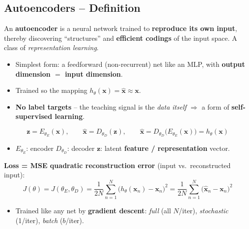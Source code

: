 \documentclass[10pt,a4paper]{article}
\begin{document}
	\subsection{Autoencoders -- Definition}

	\begin{definitionbox}
		An \textbf{autoencoder} is a neural network trained to \textbf{reproduce its own input}, thereby discovering ``structures'' and \textbf{efficient codings} of the input space. A class of \emph{representation learning}.
	\end{definitionbox}

	\begin{itemize}[leftmargin=*]
		\item Simplest form: a feedforward (non-recurrent) net like an MLP, with \textbf{output dimension $=$ input dimension}.
		\item Trained so the mapping $h_\theta(\mathbf{x}) = \hat{\mathbf{x}} \approx \mathbf{x}$.
		\item \textbf{No label targets} -- the teaching signal is the \emph{data itself} $\Rightarrow$ a form of \textbf{self-supervised learning}.
	\end{itemize}

	\begin{formulabox}
		\[
		\mathbf{z} = E_{\theta_E}(\mathbf{x}), \qquad
		\hat{\mathbf{x}} = D_{\theta_D}(\mathbf{z}), \qquad
		\hat{\mathbf{x}} = D_{\theta_D}\!\big(E_{\theta_E}(\mathbf{x})\big) = h_\theta(\mathbf{x})
		\]
	\end{formulabox}
	\begin{itemize}[leftmargin=*]
		\item $E_{\theta_E}$: encoder \quad $D_{\theta_D}$: decoder \quad $\mathbf{z}$: latent \textbf{feature / representation} vector.
	\end{itemize}

	\begin{formulabox}
		\textbf{Loss = MSE quadratic reconstruction error} (input vs.\ reconstructed input):
		\[
		J(\theta) = J(\theta_E,\theta_D) = \frac{1}{2N}\sum_{n=1}^{N}\big(h_\theta(\mathbf{x}_n) - \mathbf{x}_n\big)^2
		= \frac{1}{2N}\sum_{n=1}^{N}\big(\hat{\mathbf{x}}_n - \mathbf{x}_n\big)^2
		\]
	\end{formulabox}
	\begin{itemize}[leftmargin=*]
		\item Trained like any net by \textbf{gradient descent}: \emph{full} (all $N$/iter), \emph{stochastic} (1/iter), \emph{batch} ($b$/iter).
	\end{itemize}
\end{document}
